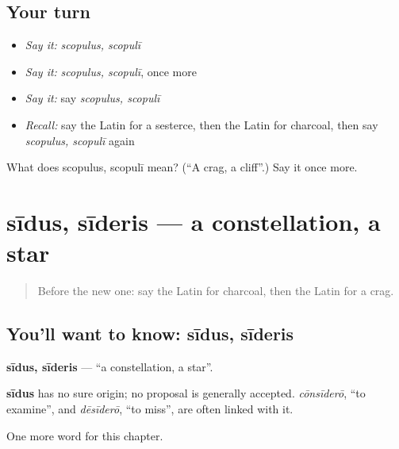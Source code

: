 \subsection*{Your turn}
\begin{itemize}
\raggedright
  \item \emph{Say it:} \emph{scopulus, scopulī}
  \item \emph{Say it:} \emph{scopulus, scopulī}, once more
  \item \emph{Say it:} say \emph{scopulus, scopulī}
  \item \emph{Recall:} say the Latin for a sesterce, then the Latin for charcoal, then say \emph{scopulus, scopulī} again
\end{itemize}

\begin{tcolorbox}[breakable,colback=teal!4,colframe=teal!35!black,title={Before you move on}]
What does scopulus, scopulī mean? (\textquotedblleft{}A crag, a cliff\textquotedblright{}.) Say it once more.
\end{tcolorbox}
\section[sīdus, sīderis]{sīdus, sīderis — a constellation, a star}

\label{lesson:LA-C191-sidus}



\begin{quote}
Before the new one: say the Latin for charcoal, then the Latin for a crag.
\end{quote}

\subsection*{You'll want to know: sīdus, sīderis}
\textbf{sīdus, sīderis} — \textquotedblleft{}a constellation, a star\textquotedblright{}.

\begin{cousinweb}
\textbf{sīdus} has no sure origin; no proposal is generally accepted. \emph{cōnsīderō}, \textquotedblleft{}to examine\textquotedblright{}, and \emph{dēsīderō}, \textquotedblleft{}to miss\textquotedblright{}, are often linked with it.
\end{cousinweb}

\begin{grammarlens}[title={What you've built}]
One more word for this chapter.
\end{grammarlens}

